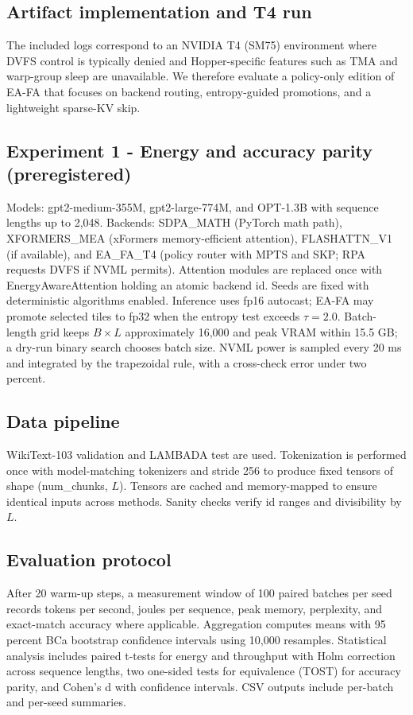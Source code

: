 \documentclass{article}
\begin{document}
\subsection{Artifact implementation and T4 run}
The included logs correspond to an NVIDIA T4 (SM75) environment where DVFS control is typically denied and Hopper-specific features such as TMA and warp-group sleep are unavailable. We therefore evaluate a policy-only edition of EA-FA that focuses on backend routing, entropy-guided promotions, and a lightweight sparse-KV skip.

\subsection{Experiment 1 - Energy and accuracy parity (preregistered)}
Models: gpt2-medium-355M, gpt2-large-774M, and OPT-1.3B with sequence lengths up to 2,048. Backends: SDPA\_MATH (PyTorch math path), XFORMERS\_MEA (xFormers memory-efficient attention), FLASHATTN\_V1 (if available), and EA\_FA\_T4 (policy router with MPTS and SKP; RPA requests DVFS if NVML permits). Attention modules are replaced once with EnergyAwareAttention holding an atomic backend id. Seeds are fixed with deterministic algorithms enabled. Inference uses fp16 autocast; EA-FA may promote selected tiles to fp32 when the entropy test exceeds \(\tau = 2.0\). Batch-length grid keeps \(B\times L\) approximately 16,000 and peak VRAM within 15.5 GB; a dry-run binary search chooses batch size. NVML power is sampled every 20 ms and integrated by the trapezoidal rule, with a cross-check error under two percent.

\subsection{Data pipeline}
WikiText-103 validation and LAMBADA test are used. Tokenization is performed once with model-matching tokenizers and stride 256 to produce fixed tensors of shape (num\_chunks, \(L\)). Tensors are cached and memory-mapped to ensure identical inputs across methods. Sanity checks verify id ranges and divisibility by \(L\).

\subsection{Evaluation protocol}
After 20 warm-up steps, a measurement window of 100 paired batches per seed records tokens per second, joules per sequence, peak memory, perplexity, and exact-match accuracy where applicable. Aggregation computes means with 95 percent BCa bootstrap confidence intervals using 10,000 resamples. Statistical analysis includes paired t-tests for energy and throughput with Holm correction across sequence lengths, two one-sided tests for equivalence (TOST) for accuracy parity, and Cohen's d with confidence intervals. CSV outputs include per-batch and per-seed summaries.
\end{document}
